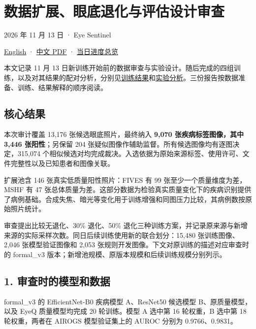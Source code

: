 \documentclass[
  10pt,
]{article}
\author{}
\date{}
\begin{document}
\section{数据扩展、眼底退化与评估设计审查}\label{ux6570ux636eux6269ux5c55ux773cux5e95ux9000ux5316ux4e0eux8bc4ux4f30ux8bbeux8ba1ux5ba1ux67e5}

2026 年 11 月 13 日 · Eye Sentinel

\href{data-and-degradation-review.en.md}{English} ·
\href{data-and-degradation-review.zh.pdf}{中文 PDF} ·
\href{../progress-overview.zh.md}{当日进度总览}

本文记录 11 月 13
日新训练开始前的数据审查与实验设计。随后完成的四组训练，以及对其结果的配对分析，分别见\href{../training-results/training-results.zh.md}{训练结果}和\href{../experimental-analysis/experimental-analysis.zh.md}{实验分析}。三份报告按数据准备、训练、结果解释的顺序阅读。

\subsection{核心结果}\label{ux6838ux5fc3ux7ed3ux679c}

本次审计覆盖 13,176 张候选眼底照片，最终纳入 \textbf{9,070
张疾病标签图像，其中 3,446 张阳性}；另保留 204
张疑似图像作辅助监督。所有候选图像均有逐图决定，315,074
个相似候选对均完成裁决。入选依据为原始来源标签、使用许可、文件完整性以及已知患者和图像关联。

扩展池含 146 张真实低质量阳性照片：FIVES 有 99
张至少一个质量维度为差，MSHF 有 47
张总体质量为差。这部分数据为检验真实质量变化下的疾病识别提供了病例基础。合成失焦、暗光等变化用于训练增强和同图压力比较，其病例数按原始照片统计。

审查提出比较无退化、30\% 退化、50\%
退化三种训练方案，并记录原来源与新增来源的实际采样次数。同日后续训练使用新的联合划分：15,480
张训练图像、2,046 张模型验证图像和 2,053
张规则开发图像。下文对原训练的描述对应审查时的 formal\_v3
版本；新增池规模、原版本规模和后续训练规模分别列示。

\subsection{1.
审查时的模型和数据}\label{ux5ba1ux67e5ux65f6ux7684ux6a21ux578bux548cux6570ux636e}

formal\_v3 的 EfficientNet-B0 疾病模型 A、ResNet50 候选模型
B、原质量模型，以及 EyeQ 质量模型均完成 20 轮训练。模型 A 选中第 16
轮权重，B 选中第 18 轮权重，两者在 AIROGS 模型验证集上的 AUROC 分别为
0.9766、0.9831。
\end{document}
